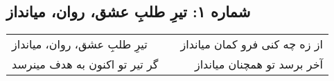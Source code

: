 \begin{center}
\section*{شماره ۱: تیرِ طلبِ عشق، روان، میانداز}
\label{sec:001}
\begin{longtable}{l p{0.5cm} r}
تیرِ طلبِ عشق، روان، میانداز
&&
از زه چه کنی فرو کمان میانداز
\\
گر تیر تو اکنون به هدف مینرسد
&&
آخر برسد تو همچنان میانداز
\\
\end{longtable}
\end{center}
